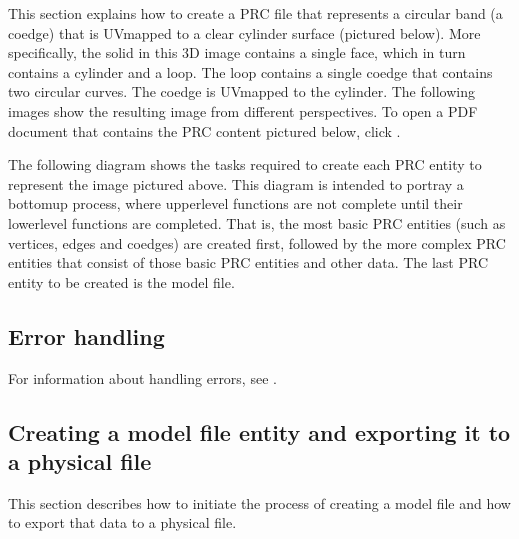 \documentclass[letterpaper,12pt,english,openany,oneside]{sphinxmanual}
\begin{document}
This section explains how to create a PRC file that represents a circular band (a co\sphinxhyphen{}edge) that is UV\sphinxhyphen{}mapped to a clear cylinder surface (pictured below). More specifically, the solid in this 3D image contains a single face, which in turn contains a cylinder and a loop. The loop contains a single co\sphinxhyphen{}edge that contains two circular curves. The co\sphinxhyphen{}edge is UV\sphinxhyphen{}mapped to the cylinder. The following images show the resulting image from different perspectives. To open a PDF document that contains the PRC content pictured below, click .

\noindent{}
\label{\detokenize{Plugins_A3D_API:section-1}}
The following diagram shows the tasks required to create each PRC entity to represent the image pictured above. This diagram is intended to portray a bottom\sphinxhyphen{}up process, where upper\sphinxhyphen{}level functions are not complete until their lower\sphinxhyphen{}level functions are completed. That is, the most basic PRC entities (such as vertices, edges and coedges) are created first, followed by the more complex PRC entities that consist of those basic PRC entities and other data. The last PRC entity to be created is the model file.

\noindent{}

\noindent{}


\subsection{Error handling}
\label{\detokenize{Plugins_A3D_API:error-handling}}\label{\detokenize{Plugins_A3D_API:handling-errors-1}}
For information about handling errors, see .


\subsection{Creating a model file entity and exporting it to a physical file}
\label{\detokenize{Plugins_A3D_API:creating-a-model-file-entity-and-exporting-it-to-a-physical-file}}
This section describes how to initiate the process of creating a model file and how to export that data to a physical file.
\end{document}
